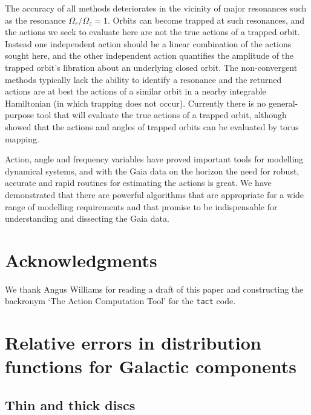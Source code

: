 \documentclass[useAMS,usenatbib,fleqn,a4paper]{mn2e}
\begin{document}
The accuracy of all methods deteriorates in the vicinity of major resonances
such as the resonance $\Omega_r/\Omega_z=1$. Orbits can become trapped at
such resonances, and the actions we seek to evaluate here are not the true
actions of a trapped orbit. Instead one independent action should be a linear
combination of the actions sought here, and the other independent action
quantifies the amplitude of the trapped orbit's libration about an underlying
closed orbit.  The non-convergent methods typically lack the ability to
identify a resonance and the returned actions are at best the actions of a
similar orbit in a nearby integrable Hamiltonian (in which trapping does not
occur). Currently there is no general-purpose tool that will evaluate the
true actions of a trapped orbit, although \cite{KaasalainenB} showed that the
actions and angles of trapped orbits can be evaluated by torus mapping.

Action, angle and frequency variables have proved important tools for modelling dynamical systems, and with the Gaia data on the horizon the need for robust, accurate and rapid routines for estimating the actions is great. We have demonstrated that there are powerful algorithms that are appropriate for a wide range of modelling requirements and that promise to be indispensable for understanding and dissecting the Gaia data.

\section*{Acknowledgments}
We thank Angus Williams for reading a draft of this paper and constructing the backronym `The Action Computation Tool' for the \texttt{tact} code.




\appendix
\section{Relative errors in distribution functions for Galactic components}\label{Appendix}
\subsection{Thin and thick discs}
\end{document}
